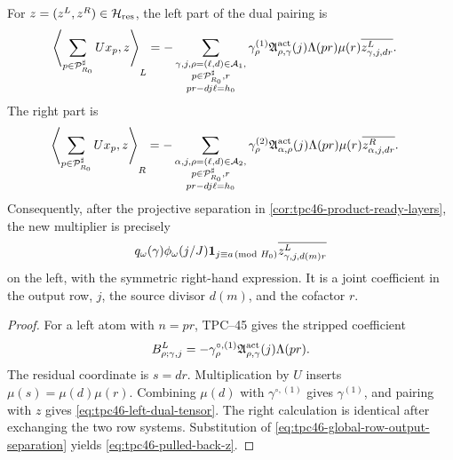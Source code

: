 \begin{proposition}
\label{prop:tpc46-dual-tensor}
For \(z=(z^L,z^R)\in\mathcal H_{\rm res}\), the left part of the dual pairing
is
\begin{align}
 \left\langle\sum_{p\in\mathcal P_{R_0}^{\sharp}}Ux_p,z\right\rangle_L
 ={}-&\sum_{\substack{\gamma,j,\rho=(\ell,d)\in\mathcal A_1,\\
                       p\in\mathcal P_{R_0}^{\sharp},r\\
                       pr-dj\ell=h_0}}
 \gamma_\rho^{(1)}
 \mathfrak A_{\rho,\gamma}^{\rm act}(j)
 \Lambda(pr)\mu(r)
 \overline{z^L_{\gamma,j,dr}}.
 \label{eq:tpc46-left-dual-tensor}
\end{align}
The right part is
\begin{align}
 \left\langle\sum_{p\in\mathcal P_{R_0}^{\sharp}}Ux_p,z\right\rangle_R
 ={}-&\sum_{\substack{\alpha,j,\rho=(\ell,d)\in\mathcal A_2,\\
                       p\in\mathcal P_{R_0}^{\sharp},r\\
                       pr-dj\ell=h_0}}
 \gamma_\rho^{(2)}
 \mathfrak A_{\alpha,\rho}^{\rm act}(j)
 \Lambda(pr)\mu(r)
 \overline{z^R_{\alpha,j,dr}}.
 \label{eq:tpc46-right-dual-tensor}
\end{align}
Consequently, after the projective separation in
\cref{cor:tpc46-product-ready-layers}, the new multiplier is precisely
\begin{equation}
 q_\omega(\gamma)\phi_\omega(j/J)
 \mathbf 1_{j\equiv a\!\!\pmod{H_0}}
 \overline{z^L_{\gamma,j,d(m)r}}
 \label{eq:tpc46-pulled-back-z}
\end{equation}
on the left, with the symmetric right-hand expression.  It is a joint
coefficient in the output row, \(j\), the source divisor \(d(m)\), and
the cofactor \(r\).
\end{proposition}

\begin{proof}
For a left atom with \(n=pr\), TPC--45 gives the stripped coefficient
\begin{equation}
 B^L_{\rho;\gamma,j}
 =-\gamma_\rho^{\circ,(1)}
  \mathfrak A_{\rho,\gamma}^{\rm act}(j)\Lambda(pr).
 \label{eq:tpc46-stripped-B}
\end{equation}
The residual coordinate is \(s=dr\).  Multiplication by \(U\) inserts
\(\mu(s)=\mu(d)\mu(r)\).  Combining \(\mu(d)\) with
\(\gamma^{\circ,(1)}\) gives \(\gamma^{(1)}\), and pairing with \(z\)
gives \eqref{eq:tpc46-left-dual-tensor}.  The right calculation is
identical after exchanging the two row systems.  Substitution of
\eqref{eq:tpc46-global-row-output-separation} yields
\eqref{eq:tpc46-pulled-back-z}.
\end{proof}

